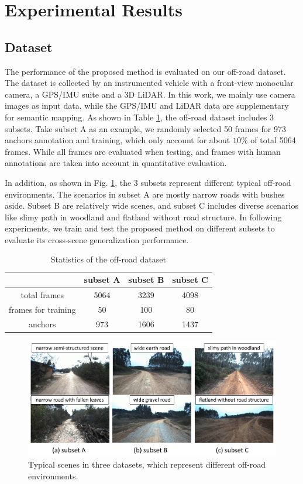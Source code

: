 \documentclass[letterpaper, 10 pt, conference]{ieeeconf}  %
\begin{document}
\section{Experimental Results}	\label{exp}
\subsection{Dataset}
The performance of the proposed method is evaluated on our off-road dataset. The dataset is collected by an instrumented vehicle with a front-view monocular camera, a GPS/IMU suite and a 3D LiDAR. In this work, we mainly use camera images as input data, while the GPS/IMU and LiDAR data are supplementary for semantic mapping.
As shown in Table \ref{tab:dataset}, the off-road dataset includes 3 subsets. Take subset A as an example, we randomly selected 50 frames for 973 anchors annotation and training, which only account for about $10\%$ of total 5064 frames. While all frames are evaluated when testing, and frames with human annotations are taken into account in quantitative evaluation.

In addition, as shown in Fig. \ref{fig:dataset}, the 3 subsets represent different typical off-road environments. The scenarios in subset A are mostly narrow roads with bushes aside. Subset B are relatively wide scenes, and subset C includes diverse scenarios like slimy path in woodland and flatland without road structure. In following experiments, we train and test the proposed method on different subsets to evaluate its cross-scene generalization performance.

\begin{table}[h]
	\centering
	\caption{Statistics of the off-road dataset}
	\label{tab:dataset}
	\begin{tabular}{cccc} 
		\hline
		& subset A & subset B & subset C  \\ 
		\hline
		total frames        & 5064     & 3239     & 4098      \\
		frames for training & 50       & 100      & 80        \\
		anchors       & 973      & 1606     & 1437      \\
		\hline
	\end{tabular}
\end{table}

\begin{figure}[h]
	\centering
	\includegraphics[scale=0.28]{dataset.pdf}
	\caption{Typical scenes in three datasets, which represent different off-road environments.}
	\label{fig:dataset}
\end{figure}
\end{document}
